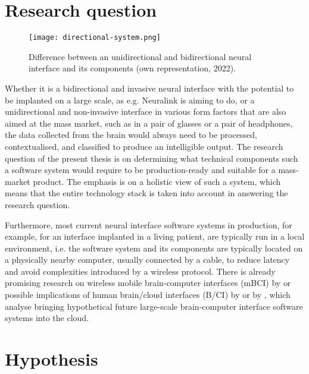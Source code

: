 \section{Research question}
\label{chapter1-research-question}

\begin{figure}[ht]
  \centering
  \texttt{[image: directional-system.png]}
  \caption{Difference between an unidirectional and bidirectional neural interface and its components (own representation, 2022).}
  \label{fig:directional-system}
\end{figure}

Whether it is a bidirectional and invasive neural interface with the potential to be implanted on a large scale, as e.g. Neuralink is aiming to do, or a unidirectional and non-invasive interface in various form factors that are also aimed at the mass market, such as in a pair of glasses or a pair of headphones, the data collected from the brain would always need to be processed, contextualised, and classified to produce an intelligible output. The research question of the present thesis is on determining what technical components such a software system would require to be production-ready and suitable for a mass-market product. The emphasis is on a holistic view of such a system, which means that the entire technology stack is taken into account in answering the research question.

Furthermore, most current neural interface software systems in production, for example, for an interface implanted in a living patient, are typically run in a local environment, i.e. the software system and its components are typically located on a physically nearby computer, usually connected by a cable, to reduce latency and avoid complexities introduced by a wireless protocol. There is already promising research on wireless mobile brain-computer interfaces (mBCI) by \citeauthor{minguillon_mobile_2017} \citeyearpar{minguillon_mobile_2017} or possible implications of human brain/cloud interfaces (B/CI) by \citeauthor{martins_human_2019} \citeyearpar{martins_human_2019} or by \citeauthor{angelica_cognitive_2021} \citeyearpar{angelica_cognitive_2021}, which analyse bringing hypothetical future large-scale brain-computer interface software systems into the cloud.


\section{Hypothesis}
\label{chapter1-hypothesis}

